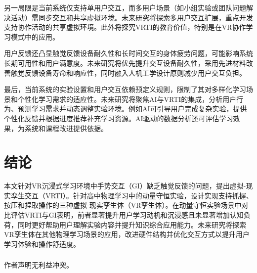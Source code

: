 \documentclass[runningheads]{llncs}
\begin{document}
另一局限是当前系统仅支持单用户交互，而多用户场景（如小组实验或团队问题解决活动）需同步交互和共享虚拟环境。未来研究将探索多用户交互扩展，重点开发支持协作活动的共享虚拟环境。此外将探究VRTI的教育价值，特别是在VR协作学习模式中的应用。

用户反馈还凸显触觉反馈设备耐久性和长时间交互的身体疲劳问题，可能影响系统长期可用性和用户满意度。未来研究将优先提升交互设备耐久性，采用先进材料改善触觉反馈设备寿命和响应性，同时融入人机工学设计原则减少用户交互负担。

最后，当前系统的实验设置和用户交互依赖预定义规则，限制了其对多样化学习场景和个性化学习需求的适应性。未来研究将聚焦AI与VRTI的集成，分析用户行为、预测学习需求并动态调整实验环境。例如AI可引导用户完成复杂实验，提供个性化反馈并根据进度推荐补充学习资源。AI驱动的数据分析还可评估学习效果，为系统和课程改进提供依据。

\section{结论}
本文针对VR沉浸式学习环境中手势交互（GI）缺乏触觉反馈的问题，提出虚拟-现实孪生交互（VRTI）。针对高中物理学习中的动量守恒实验，设计实现支持抓握、按压和捏取操作的三种虚拟-现实孪生体（VR孪生体）。在动量守恒实验场景中对比评估VRTI与GI表明，前者显著提升用户学习动机和沉浸感且未显著增加认知负荷，同时更好帮助用户理解实验内容并提升知识综合应用能力。未来研究将探索VR孪生体在其他物理学习场景的应用，改进硬件结构并优化交互方式以提升用户学习体验和操作舒适度。

\begin{credits}
\subsubsection{\ackname} 

\subsubsection{\discintname}
作者声明无利益冲突。
\end{credits}



\end{document}
